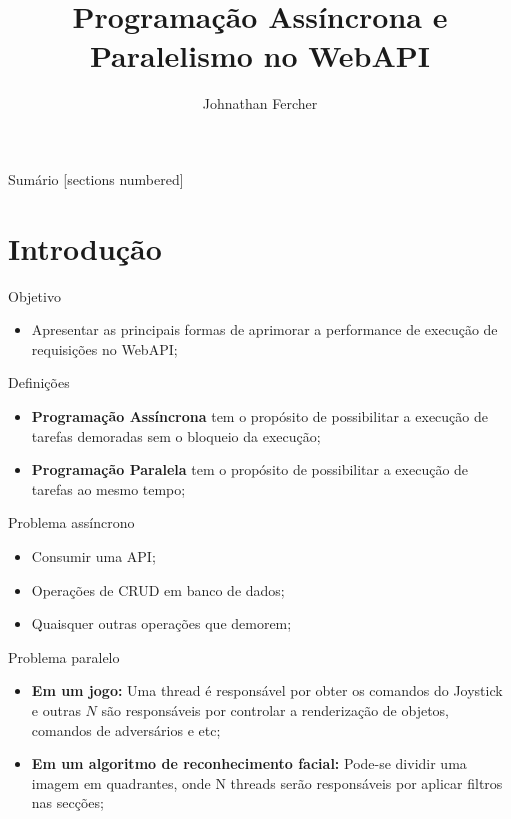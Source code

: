 \documentclass[10pt]{beamer}
\title{Programação Assíncrona e Paralelismo no WebAPI}
\author{Johnathan Fercher}
\begin{document}
\maketitle

\begin{frame}{Sumário}
  [sections numbered]
  \tableofcontents[hideallsubsections]
\end{frame}

\section{Introdução}

\begin{frame}[fragile]{Objetivo}
	\begin{itemize}
		\item Apresentar as principais formas de aprimorar a performance de execução de requisições no WebAPI;
	\end{itemize}
\end{frame}

\begin{frame}[fragile]{Definições}
	\begin{itemize}
		\item \textbf{Programação Assíncrona} tem o propósito de possibilitar a execução de tarefas demoradas sem o bloqueio da execução;
		\vspace{0.2cm}
		\item \textbf{Programação Paralela} tem o propósito de possibilitar a execução de tarefas ao mesmo tempo;
	\end{itemize}
\end{frame}

\begin{frame}[fragile]{Problema assíncrono}
	\begin{itemize}
		\item Consumir uma API;
		\vspace{0.2cm}
		\item Operações de CRUD em banco de dados;
		\vspace{0.2cm}
		\item Quaisquer outras operações que demorem;
	\end{itemize}
\end{frame}

\begin{frame}[fragile]{Problema paralelo}
	\begin{itemize}
		\item \textbf{Em um jogo:} Uma thread é responsável por obter os comandos do Joystick e outras $N$ são responsáveis por controlar a renderização de objetos, comandos de adversários e etc;
		\vspace{0.2cm}
		\item \textbf{Em um algoritmo de reconhecimento facial:} Pode-se dividir uma imagem em quadrantes, onde N threads serão responsáveis por aplicar filtros nas secções;
	\end{itemize}
\end{frame}
\end{document}
